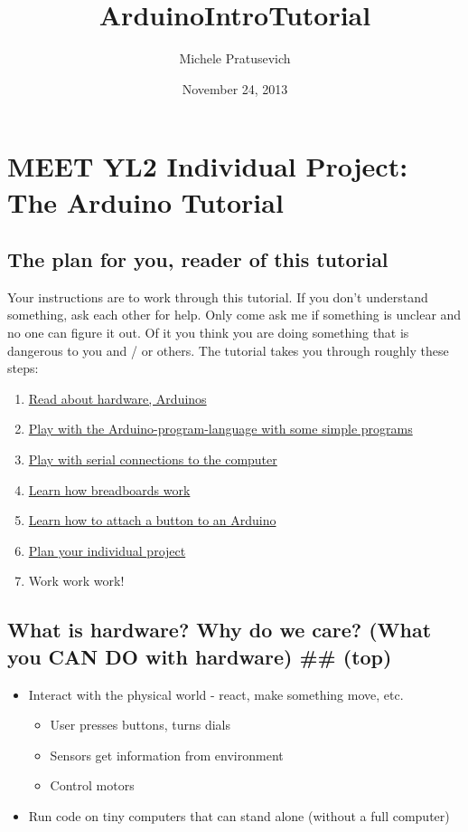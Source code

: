 \documentclass[letterpaper,10pt,english]{/usr/local/lib/python2.7/dist-packages/sphinx/texinputs/sphinxhowto}
\title{ArduinoIntroTutorial}
\date{November 24, 2013}
\author{Michele Pratusevich}
\begin{document}
        
            \maketitle
        

        


        
        \section{MEET YL2 Individual Project: The Arduino Tutorial }

\subsection{The plan for you, reader of this tutorial}

Your instructions are to work through this tutorial. If you don't
understand something, ask each other for help. Only come ask me if
something is unclear and no one can figure it out. Of it you think you
are doing something that is dangerous to you and / or others. The
tutorial takes you through roughly these steps:

\begin{enumerate}[1.]
\item
  \href{\#hardware}{Read about hardware, Arduinos}
\item
  \href{\#simpleprogram}{Play with the Arduino-program-language with
  some simple programs}
\item
  \href{\#serial}{Play with serial connections to the computer}
\item
  \href{\#breadboards}{Learn how breadboards work}
\item
  \href{\#button}{Learn how to attach a button to an Arduino}
\item
  \href{\#indivproj}{Plan your individual project}
\item
  Work work work!
\end{enumerate}\subsection{What is hardware? Why do we care? (What you CAN DO with
hardware) \#\# (top)}

\begin{itemize}
\item
  Interact with the physical world - react, make something move, etc.
  \begin{itemize}
  \item
    User presses buttons, turns dials
  \item
    Sensors get information from environment
  \item
    Control motors
  \end{itemize}
\item
  Run code on tiny computers that can stand alone (without a full
  computer)
\end{itemize}
\end{document}
